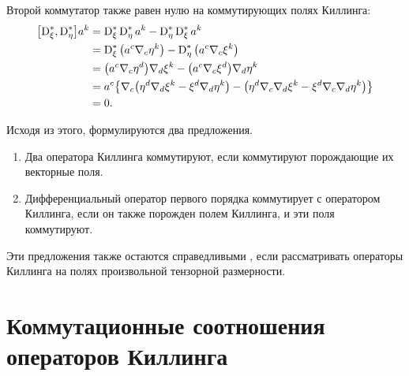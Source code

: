 \documentclass[12pt,a4paper]{article}
\begin{document}
            Второй коммутатор также равен нулю на коммутирующих полях Киллинга:
            \begin{equation}\begin{aligned}
                \comm{\D^{*}_\xi}{\D^{*}_\eta} a^k
                    &= \D^{*}_\xi \D^{*}_\eta a^k - \D^{*}_\eta \D^{*}_\xi a^k \\
                    &= \D^{*}_\xi \qty( a^c \nabla_c \eta^k )
                     - \D^{*}_\eta \qty( a^c \nabla_c \xi^k ) \\
                    &= \qty( a^c \nabla_c \eta^d ) \nabla_d \xi^k
                     - \qty( a^c \nabla_c \xi^d ) \nabla_d \eta^k \\
                    &= a^c \qty{
                        \nabla_c \qty( \eta^d \nabla_d \xi^k - \xi^d \nabla_d \eta^k ) -
                        \qty( \eta^d \nabla_c \nabla_d \xi^k - \xi^d \nabla_c \nabla_d \eta^k )
                    } \\
                    &= 0 .
            \end{aligned}\end{equation}

            Исходя из этого, формулируются два предложения.
            \begin{enumerate}[noitemsep]
                \item Два оператора Киллинга коммутируют, если коммутируют порождающие их векторные поля.
                \item Дифференциальный оператор первого порядка коммутирует с оператором Киллинга, если он также порожден полем Киллинга, и эти поля коммутируют.
            \end{enumerate}
            Эти предложения также остаются справедливыми \cite{burlankov_space_dynamics}, если рассматривать операторы Киллинга на полях произвольной тензорной размерности.


    \section{Коммутационные соотношения операторов Киллинга}
\end{document}
